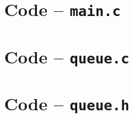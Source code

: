 \documentclass[a4paper,11pt]{kth-mag}
\begin{document}
\chapter{Code -- \texttt{main.c}}


\chapter{Code -- \texttt{queue.c}}


\chapter{Code -- \texttt{queue.h}}


\clearpage
%
%


\end{document}
